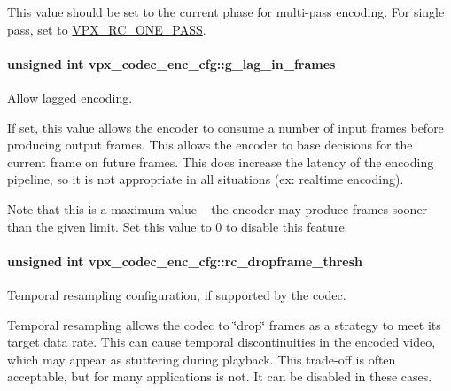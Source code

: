 This value should be set to the current phase for multi-\/pass encoding. For single pass, set to \hyperlink{group__encoder_gga476c5417f9c15a1dc5d3f68fa44c493fa7b6943a41868e8e26a77e9500f139ca1}{V\-P\-X\-\_\-\-R\-C\-\_\-\-O\-N\-E\-\_\-\-P\-A\-S\-S}. \hypertarget{structvpx__codec__enc__cfg_a992668d9e30305f3f7ab2672ea31a890}{
\paragraph[{g\-\_\-lag\-\_\-in\-\_\-frames}]{\setlength{\rightskip}{0pt plus 5cm}unsigned int vpx\-\_\-codec\-\_\-enc\-\_\-cfg\-::g\-\_\-lag\-\_\-in\-\_\-frames}}\label{structvpx__codec__enc__cfg_a992668d9e30305f3f7ab2672ea31a890}


Allow lagged encoding. 

If set, this value allows the encoder to consume a number of input frames before producing output frames. This allows the encoder to base decisions for the current frame on future frames. This does increase the latency of the encoding pipeline, so it is not appropriate in all situations (ex\-: realtime encoding).

Note that this is a maximum value -- the encoder may produce frames sooner than the given limit. Set this value to 0 to disable this feature. \hypertarget{structvpx__codec__enc__cfg_a619269f9a6904de58c4790e6806a3905}{
\paragraph[{rc\-\_\-dropframe\-\_\-thresh}]{\setlength{\rightskip}{0pt plus 5cm}unsigned int vpx\-\_\-codec\-\_\-enc\-\_\-cfg\-::rc\-\_\-dropframe\-\_\-thresh}}\label{structvpx__codec__enc__cfg_a619269f9a6904de58c4790e6806a3905}


Temporal resampling configuration, if supported by the codec. 

Temporal resampling allows the codec to \char`\"{}drop\char`\"{} frames as a strategy to meet its target data rate. This can cause temporal discontinuities in the encoded video, which may appear as stuttering during playback. This trade-\/off is often acceptable, but for many applications is not. It can be disabled in these cases.

